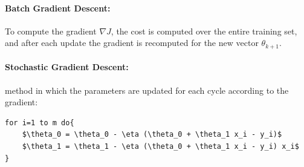 \paragraph{Batch Gradient Descent:} To compute the gradient $\nabla J$, the cost is computed over the entire training set, and after each update the gradient is recomputed for the new vector $\theta_{k+1}$.
\paragraph{Stochastic Gradient Descent:} method in which the parameters are updated for each cycle according to the gradient:
\begin{lstlisting}[mathescape=true]
for i=1 to m do{
    $\theta_0 = \theta_0 - \eta (\theta_0 + \theta_1 x_i - y_i)$
    $\theta_1 = \theta_1 - \eta (\theta_0 + \theta_1 x_i - y_i) x_i$
}
\end{lstlisting}

